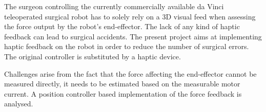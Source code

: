 The surgeon controlling the currently commercially available da Vinci teleoperated surgical robot has to solely rely on a 3D visual feed when assessing the force output by the robot's end-effector. The lack of any kind of haptic feedback can lead to surgical accidents. The present project aims at implementing haptic feedback on the robot in order to reduce the number of surgical errors.
The original controller is substituted by a haptic device.

Challenges arise from the fact that the force affecting the end-effector cannot be measured directly, it needs to be estimated based on the measurable motor current. A position controller based implementation of the force feedback is analysed.